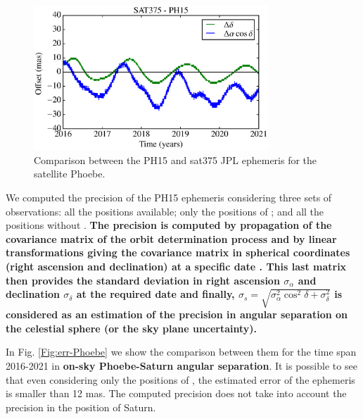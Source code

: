 \documentclass[useAMS,usenatbib]{mn2e}
\begin{document}
\begin{figure}
\begin{centering}
\includegraphics[width=8.8cm]{figures/Phoebe.eps} 
\caption{Comparison between the PH15 and sat375 JPL ephemeris for the satellite Phoebe.}
\label{Fig:eph-Phoebe}
\end{centering}
\end{figure}

We computed the precision of the PH15 ephemeris considering three sets of observations: all the positions available; only the positions of ; and all the positions without .
\textbf{The precision is computed by propagation of the covariance matrix of the orbit determination process and by linear transformations giving the covariance matrix in spherical coordinates (right ascension and declination) at a specific date \citep[for more details, see][]{Desmars2013a}. This last matrix then provides the standard deviation in right ascension $\sigma_\alpha$ and declination  $\sigma_\delta$ at the required date and finally, $\sigma_s=\sqrt{\sigma^2_\alpha\cos^2\delta+\sigma^2_\delta}$ is considered as an estimation of the precision in angular separation on the celestial sphere (or the sky plane uncertainty).}


In Fig. \ref{Fig:err-Phoebe} we show the comparison between them for the time span 2016-2021 in \textbf{on-sky Phoebe-Saturn angular separation}. It is possible to see that even considering only the positions of , the estimated error of the ephemeris is smaller than 12 mas. The computed precision does not take into account the precision in the position of Saturn.
\end{document}
